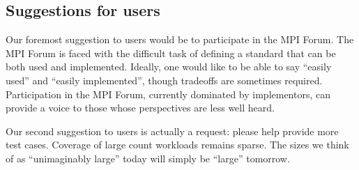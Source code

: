 
\subsection{Suggestions for users}

Our foremost suggestion to users would be to participate in the MPI Forum.  The
MPI Forum is faced with the difficult task of defining a standard that can be
both used and implemented.  Ideally, one would like to be able to say ``easily
used'' and ``easily implemented'', though tradeoffs are sometimes required.
Participation in the MPI Forum, currently dominated by implementors, can
provide a voice to those whose perspectives are less well heard.

Our second suggestion to users is actually a request: please help provide more
test cases.  Coverage of large count workloads remains sparse.  The sizes we
think of as ``unimaginably large'' today will simply be ``large'' tomorrow.
